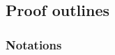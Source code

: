\documentclass{article}
\begin{document}
\subsection{Proof outlines}

\subsubsection{Notations}
\end{document}

